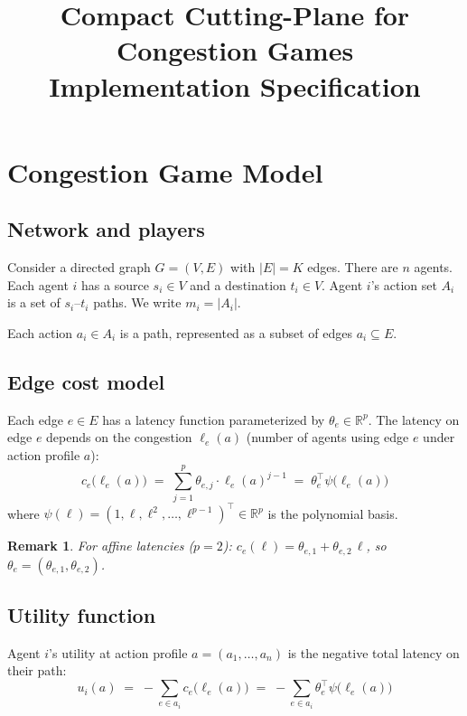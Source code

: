\documentclass[11pt]{article}
\title{\textbf{Compact Cutting-Plane for Congestion Games} \\ \large Implementation Specification}
\author{}
\date{}
\newcommand{\R}{\mathbb{R}}
\newtheorem{remark}{Remark}
\begin{document}
\maketitle

\section{Congestion Game Model}

\subsection{Network and players}

Consider a directed graph $G = (V, E)$ with $|E| = K$ edges. There are $n$ agents. Each agent $i$ has a source $s_i \in V$ and a destination $t_i \in V$. Agent $i$'s action set $A_i$ is a set of $s_i$--$t_i$ paths. We write $m_i = |A_i|$.

Each action $a_i \in A_i$ is a path, represented as a subset of edges $a_i \subseteq E$.

\subsection{Edge cost model}

Each edge $e \in E$ has a latency function parameterized by $\theta_e \in \R^p$. The latency on edge $e$ depends on the congestion $\ell_e(a)$ (number of agents using edge $e$ under action profile $a$):
\[
c_e\bigl(\ell_e(a)\bigr) \;=\; \sum_{j=1}^{p} \theta_{e,j} \cdot \ell_e(a)^{j-1} \;=\; \theta_e^\top \psi\bigl(\ell_e(a)\bigr)
\]
where $\psi(\ell) = (1, \ell, \ell^2, \ldots, \ell^{p-1})^\top \in \R^p$ is the polynomial basis.

\begin{remark}
For affine latencies ($p=2$): $c_e(\ell) = \theta_{e,1} + \theta_{e,2}\,\ell$, so $\theta_e = (\theta_{e,1}, \theta_{e,2})$.
\end{remark}

\subsection{Utility function}

Agent $i$'s utility at action profile $a = (a_1, \ldots, a_n)$ is the negative total latency on their path:
\[
u_i(a) \;=\; -\sum_{e \in a_i} c_e\bigl(\ell_e(a)\bigr)
\;=\; -\sum_{e \in a_i} \theta_e^\top \psi\bigl(\ell_e(a)\bigr)
\]
\end{document}
